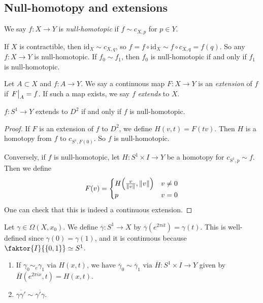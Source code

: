 \subsection{Null-homotopy and extensions}
\begin{definition}
	We say \( f \colon X \to Y \) is \emph{null-homotopic} if \( f \sim c_{X,p} \) for \( p \in Y \).
\end{definition}
\begin{example}
	If \( X \) is contractible, then \( \mathrm{id}_X \sim c_{X,q} \), so \( f = f \circ \mathrm{id}_X \sim f \circ c_{X,q} = f(q) \).
	So any \( f \colon X \to Y \) is null-homotopic.
	If \( f_0 \sim f_1 \), then \( f_0 \) is null-homotopic if and only if \( f_1 \) is null-homotopic.
\end{example}
\begin{definition}
	Let \( A \subset X \) and \( f \colon A \to Y \).
	We say a continuous map \( F \colon X \to Y \) is an \emph{extension} of \( f \) if \( \eval{F}_A = f \).
	If such a map exists, we say \( f \) \emph{extends} to \( X \).
\end{definition}
\begin{lemma}
	\( f \colon S^1 \to Y \) extends to \( D^2 \) if and only if \( f \) is null-homotopic.
\end{lemma}
\begin{proof}
	If \( F \) is an extension of \( f \) to \( D^2 \), we define \( H(v,t) = F(tv) \).
	Then \( H \) is a homotopy from \( f \) to \( c_{S^1, F(0)} \).
	So \( f \) is null-homotopic.

	Conversely, if \( f \) is null-homotopic, let \( H \colon S^1 \times I \to Y \) be a homotopy for \( c_{S^1, p} \sim f \).
	Then we define
	\[ F(v) = \begin{cases}
		H\qty(\frac{v}{\norm{v}}, \norm{v}) & v \neq 0 \\
		p & v = 0
	\end{cases} \]
	One can check that this is indeed a continuous extension.
\end{proof}
\begin{definition}
	Let \( \gamma \in \Omega(X,x_0) \).
	We define \( \overline \gamma \colon S^1 \to X \) by \( \overline\gamma(e^{2\pi i t}) = \gamma(t) \).
	This is well-defined since \( \gamma(0) = \gamma(1) \), and it is continuous because \( \faktor{I}{\qty{0,1}} \simeq S^1 \).
\end{definition}
\begin{lemma}
	\begin{enumerate}
		\item If \( \gamma_0 \sim_e \gamma_1 \) via \( H(x,t) \), we have \( \overline \gamma_0 \sim \overline \gamma_1 \) via \( \overline H \colon S^1 \times I \to Y \) given by \( \overline H(e^{2\pi i x}, t) = H(x,t) \).
		\item \( \overline{\gamma \gamma'} \sim \overline{\gamma'\gamma} \).
	\end{enumerate}
\end{lemma}
